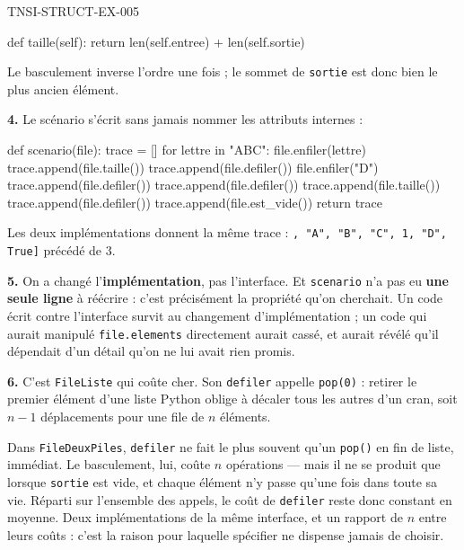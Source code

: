\begin{corrige}{TNSI-STRUCT-EX-005}
\begin{python}
    def taille(self):
        return len(self.entree) + len(self.sortie)
\end{python}
Le basculement inverse l'ordre une fois ; le sommet de \lstinline{sortie} est
donc bien le plus ancien élément.

\textbf{4.} Le scénario s'écrit sans jamais nommer les attributs internes :
\begin{python}
def scenario(file):
    trace = []
    for lettre in "ABC":
        file.enfiler(lettre)
    trace.append(file.taille())
    trace.append(file.defiler())
    file.enfiler("D")
    trace.append(file.defiler())
    trace.append(file.defiler())
    trace.append(file.taille())
    trace.append(file.defiler())
    trace.append(file.est_vide())
    return trace
\end{python}
Les deux implémentations donnent la même trace :
\lstinline!, "A", "B", "C", 1, "D", True]! précédé de $3$.

\textbf{5.} On a changé l'\textbf{implémentation}, pas l'interface. Et
\lstinline{scenario} n'a pas eu \textbf{une seule ligne} à réécrire : c'est
précisément la propriété qu'on cherchait. Un code écrit contre l'interface
survit au changement d'implémentation ; un code qui aurait manipulé
\lstinline{file.elements} directement aurait cassé, et aurait révélé qu'il
dépendait d'un détail qu'on ne lui avait rien promis.

\textbf{6.} C'est \lstinline{FileListe} qui coûte cher. Son
\lstinline{defiler} appelle \lstinline{pop(0)} : retirer le premier élément
d'une liste Python oblige à décaler tous les autres d'un cran, soit $n-1$
déplacements pour une file de $n$ éléments.

Dans \lstinline{FileDeuxPiles}, \lstinline{defiler} ne fait le plus souvent
qu'un \lstinline{pop()} en fin de liste, immédiat. Le basculement, lui, coûte
$n$ opérations — mais il ne se produit que lorsque \lstinline{sortie} est vide,
et chaque élément n'y passe qu'une fois dans toute sa vie. Réparti sur
l'ensemble des appels, le coût de \lstinline{defiler} reste donc constant en
moyenne. Deux implémentations de la même interface, et un rapport de $n$ entre
leurs coûts : c'est la raison pour laquelle spécifier ne dispense jamais de
choisir.
\end{corrige}
